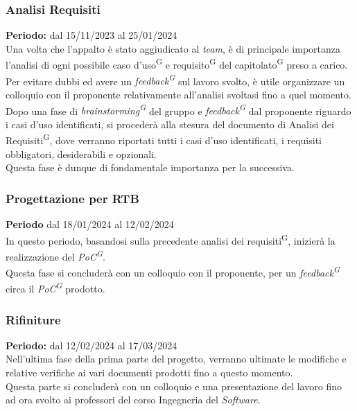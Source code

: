 \documentclass[5pt]{article}
\begin{document}
    \subsubsection{Analisi Requisiti}
      \textbf{Periodo:} dal 15/11/2023 al 25/01/2024 
      \vspace{0.3cm} \\
      Una volta che l'appalto è stato aggiudicato al \textit{team}, è di principale importanza l'analisi di ogni possibile caso d'uso\textsuperscript{G} e requisito\textsuperscript{G} del capitolato\textsuperscript{G} preso a carico.
      Per evitare dubbi ed avere un \textit{feedback\textsuperscript{G}} sul lavoro svolto, è utile organizzare un colloquio con il proponente relativamente all'analisi svoltasi fino a quel momento. \\
      Dopo una fase di \textit{brainstorming\textsuperscript{G}} del gruppo e \textit{feedback\textsuperscript{G}} dal proponente riguardo i casi d'uso identificati, si procederà alla stesura del documento di Analisi dei Requisiti\textsuperscript{G},
      dove verranno riportati tutti i casi d'uso identificati, i requisiti obbligatori, desiderabili e opzionali. \\
      Questa fase è dunque di fondamentale importanza per la successiva.
    
    \subsubsection{Progettazione per RTB}
      \textbf{Periodo} dal 18/01/2024 al 12/02/2024 
      \vspace{0.3cm} \\
      In questo periodo, basandosi sulla precedente analisi dei requisiti\textsuperscript{G}, inizierà la realizzazione del \textit{PoC\textsuperscript{G}}. \\
      Questa fase si concluderà con un colloquio con il proponente, per un \textit{feedback\textsuperscript{G}} circa il \textit{PoC\textsuperscript{G}} prodotto.
    
    \subsubsection{Rifiniture}
      \textbf{Periodo:} dal 12/02/2024 al 17/03/2024 
      \vspace{0.3cm} \\
      Nell'ultima fase della prima parte del progetto, verranno ultimate le modifiche e relative verifiche ai vari documenti 
      prodotti fino a questo momento. \\
      Questa parte si concluderà con un colloquio e una presentazione del lavoro fino ad ora svolto 
      ai professori del corso Ingegneria del \textit{Software}.
\end{document}
